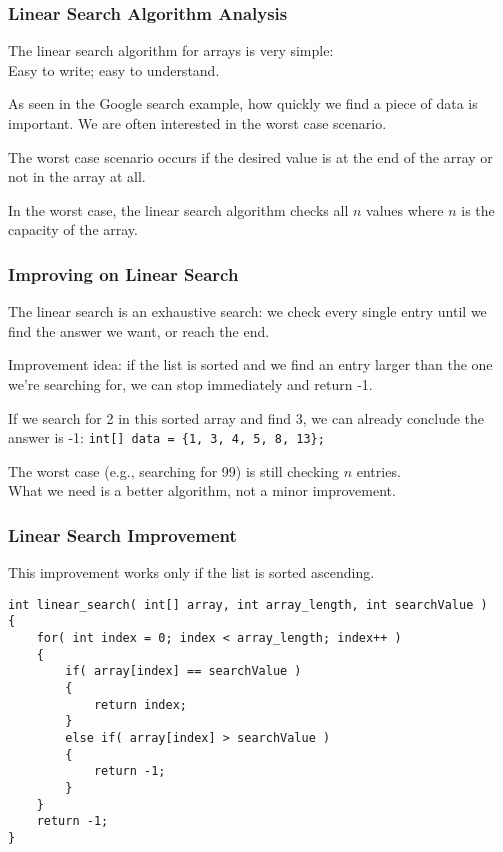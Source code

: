 \begin{frame}
\frametitle{Linear Search Algorithm Analysis}

The linear search algorithm for arrays is very simple:\\
\quad Easy to write; easy to understand.

As seen in the Google search example, how quickly we find a piece of data is important. We are often interested in the worst case scenario.

The worst case scenario occurs if the desired value is at the end of the array or not in the array at all.

In the worst case, the linear search algorithm checks all $n$ values where $n$ is the capacity of the array.

\end{frame}


\begin{frame}
\frametitle{Improving on Linear Search}
The linear search is an exhaustive search: we check every single entry until we find the answer we want, or reach the end.

Improvement idea: if the list is sorted and we find an entry larger than the one we're searching for, we can stop immediately and return -1.

If we search for 2 in this sorted array and find 3, we can already conclude the answer is -1:  \texttt{int[] data = \{1, 3, 4, 5, 8, 13\};}

The worst case (e.g., searching for 99) is still checking $n$ entries.\\
\quad What we need is a better algorithm, not a minor improvement.

\end{frame}

\begin{frame}[fragile]
\frametitle{Linear Search Improvement}

This improvement works only if the list is sorted ascending.

{\scriptsize
\begin{verbatim}
int linear_search( int[] array, int array_length, int searchValue )
{
    for( int index = 0; index < array_length; index++ )
    {
        if( array[index] == searchValue )
        {
            return index;
        }
        else if( array[index] > searchValue )
        {
            return -1;
        }
    }
    return -1;
}
\end{verbatim}
}
\end{frame}

